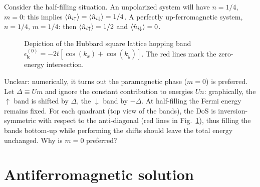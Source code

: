 Consider the half-filling situation. An unpolarized system will have $n=1/4$, $m=0$: this implies $\ev{\hat n_{i\uparrow}} = \ev{\hat n_{i\downarrow}} = 1/4$. A perfectly up-ferromagnetic system, $n=1/4$, $m=1/4$: then $\ev{\hat n_{i\uparrow}} = 1/2$ and $\ev{\hat n_{i\downarrow}} = 0$. \todo

\begin{figure}
	\centering
%	
	\caption{Depiction of the Hubbard square lattice hopping band $\epsilon_{\mathbf{k}}^{(0)} = -2t[\cos(k_x) + \cos(k_y)]$. The red lines mark the zero-energy intersection.}
	\label{appfig:ferromagnetic-3d-band}
\end{figure}

{\color{tabred} Unclear: numerically, it turns out the paramagnetic phase ($m=0$) is preferred. Let $\Delta \equiv Um$ and ignore the constant contribution to energies $Un$: graphically, the $\uparrow$ band is shifted by $\Delta$, the $\downarrow$ band by $-\Delta$. At half-filling the Fermi energy remains fixed. For each quadrant (top view of the bands), the DoS is inversion-symmetric with respect to the anti-diagonal (red lines in Fig.~\ref{appfig:ferromagnetic-3d-band}), thus filling the bands bottom-up while performing the shifts should leave the total energy unchanged. Why is $m=0$ preferred?}

\section{Antiferromagnetic solution}

